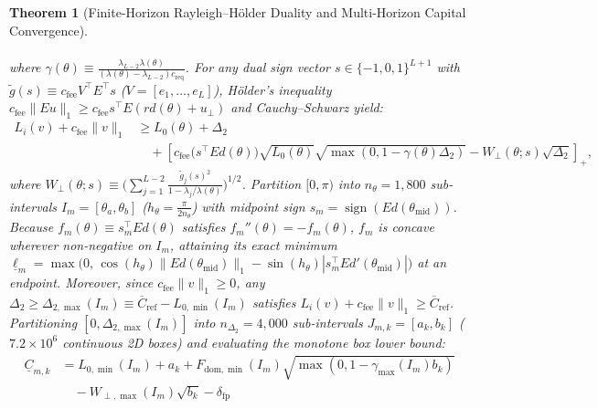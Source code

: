 \documentclass[12pt]{article}
\newtheorem{theorem}{Theorem}[section]
\theoremstyle{definition}
\theoremstyle{remark}
\begin{document}
\begin{theorem}[Finite-Horizon Rayleigh--H\"older Duality and Multi-Horizon Capital Convergence]
\begin{enumerate}
\begin{equation}
\begin{aligned}
\end{aligned}
\end{equation}
where $\gamma(\theta) \equiv \frac{\lambda_{L-2}\lambda(\theta)}{(\lambda(\theta)-\lambda_{L-2})c_{\mathrm{req}}}$. For any dual sign vector $s \in \{-1, 0, 1\}^{L+1}$ with $\tilde{g}(s) \equiv c_{\mathrm{fee}} V^\top E^\top s$ ($V = [e_1, \dots, e_L]$), Hölder's inequality $c_{\mathrm{fee}}\|E u\|_1 \ge c_{\mathrm{fee}} s^\top E(r d(\theta) + u_\perp)$ and Cauchy--Schwarz yield:
\begin{equation}
\begin{aligned}
L_i(v) + c_{\mathrm{fee}}\|v\|_1 &\ge L_0(\theta) + \Delta_2 \\
&\quad + \left[ c_{\mathrm{fee}}\bigl(s^\top E d(\theta)\bigr)\sqrt{L_0(\theta)}\sqrt{\max(0, 1 - \gamma(\theta)\Delta_2)} - W_\perp(\theta; s)\sqrt{\Delta_2} \right]_+,
\end{aligned}
\label{eq:ia_rh_2d_surface}
\end{equation}
where $W_\perp(\theta; s) \equiv \bigl(\sum_{j=1}^{L-2} \frac{\tilde{g}_j(s)^2}{1 - \lambda_j/\lambda(\theta)}\bigr)^{1/2}$. Partition $[0, \pi)$ into $n_\theta = 1{,}800$ sub-intervals $I_m = [\theta_a, \theta_b]$ ($h_\theta = \frac{\pi}{2 n_\theta}$) with midpoint sign $s_m = \operatorname{sign}(E d(\theta_{\mathrm{mid}}))$. Because $f_m(\theta) \equiv s_m^\top E d(\theta)$ satisfies $f_m''(\theta) = -f_m(\theta)$, $f_m$ is concave wherever non-negative on $I_m$, attaining its exact minimum $\underline{\ell}_m = \max\bigl(0,\, \cos(h_\theta)\|E d(\theta_{\mathrm{mid}})\|_1 - \sin(h_\theta)|s_m^\top E d'(\theta_{\mathrm{mid}})|\bigr)$ at an endpoint. Moreover, since $c_{\mathrm{fee}}\|v\|_1 \ge 0$, any $\Delta_2 \ge \Delta_{2,\max}(I_m) \equiv \overline{C}_{\mathrm{ref}} - L_{0,\min}(I_m)$ satisfies $L_i(v) + c_{\mathrm{fee}}\|v\|_1 \ge \overline{C}_{\mathrm{ref}}$. Partitioning $[0, \Delta_{2,\max}(I_m)]$ into $n_{\Delta_2} = 4{,}000$ sub-intervals $J_{m,k} = [a_k, b_k]$ ($7.2 \times 10^6$ continuous 2D boxes) and evaluating the monotone box lower bound:
\begin{equation}
\begin{aligned}
\underline{C}_{m,k} &= L_{0,\min}(I_m) + a_k + F_{\mathrm{dom},\min}(I_m)\sqrt{\max(0, 1 - \gamma_{\max}(I_m) b_k)} \\
&\quad - W_{\perp,\max}(I_m)\sqrt{b_k} - \delta_{\mathrm{fp}}
\end{aligned}
\end{equation}

\end{enumerate}
\end{theorem}
\end{document}
